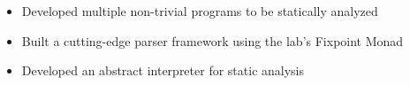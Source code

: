 \begin{itemize}
  \item Developed multiple non-trivial programs to be statically analyzed
  \item Built a cutting-edge parser framework using the lab's Fixpoint Monad
  \item Developed an abstract interpreter for static analysis
\end{itemize}
\vspace{4pt}
